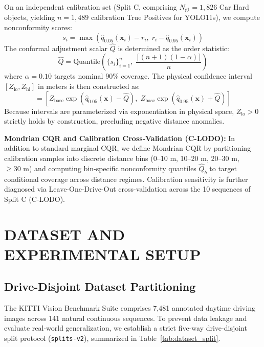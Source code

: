 \documentclass[]{spie}  %
\begin{document}
On an independent calibration set (Split C, comprising $N_{\text{gt}}=1,826$ Car Hard objects, yielding $n=1,489$ calibration True Positives for YOLO11s), we compute nonconformity scores:
\begin{equation}
s_i = \max\left(\hat{q}_{0.05}(\mathbf{x}_i) - r_i, \; r_i - \hat{q}_{0.95}(\mathbf{x}_i)\right)
\end{equation}
The conformal adjustment scalar $\hat{Q}$ is determined as the order statistic:
\begin{equation}
\hat{Q} = \text{Quantile}\left( \{s_i\}_{i=1}^n, \; \frac{\lceil (n+1)(1-\alpha) \rceil}{n} \right)
\end{equation}
where $\alpha = 0.10$ targets nominal 90\% coverage. The physical confidence interval $[Z_{\text{lo}}, Z_{\text{hi}}]$ in meters is then constructed as:
\begin{equation}
[Z_{\text{lo}}, Z_{\text{hi}}] = \left[ Z_{\text{base}} \exp(\hat{q}_{0.05}(\mathbf{x}) - \hat{Q}), \; Z_{\text{base}} \exp(\hat{q}_{0.95}(\mathbf{x}) + \hat{Q}) \right]
\end{equation}
Because intervals are parameterized via exponentiation in physical space, $Z_{\text{lo}} > 0$ strictly holds by construction, precluding negative distance anomalies.

\textbf{Mondrian CQR and Calibration Cross-Validation (C-LODO):} In addition to standard marginal CQR, we define Mondrian CQR by partitioning calibration samples into discrete distance bins (0--10 m, 10--20 m, 20--30 m, $\ge 30\text{ m}$) and computing bin-specific nonconformity quantiles $\hat{Q}_b$ to target conditional coverage across distance regimes. Calibration sensitivity is further diagnosed via Leave-One-Drive-Out cross-validation across the 10 sequences of Split C (C-LODO).

\section{DATASET AND EXPERIMENTAL SETUP}
\label{sec:dataset_setup}

\subsection{Drive-Disjoint Dataset Partitioning}
The KITTI Vision Benchmark Suite\cite{geiger2012kitti} comprises 7,481 annotated daytime driving images across 141 natural continuous sequences. To prevent data leakage and evaluate real-world generalization, we establish a strict five-way drive-disjoint split protocol (\texttt{splits-v2}), summarized in Table~\ref{tab:dataset_split}.
\end{document}

